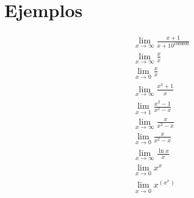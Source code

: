 \documentclass[spanish,12pt]{article}
\begin{document}
\section{Ejemplos}
\begin{align*}
    &\lim_{x\to\infty} \frac{x+1}{x+10^{1000000}}\\
    &\lim_{x\to\infty} \frac{x}{x}\\
    &\lim_{x\to0} \frac{x}{x}\\
    &\lim_{x\to\infty} \frac{x^3+1}{x}\\
    &\lim_{x\to1} \frac{x^2-1}{x^2-x}\\
    &\lim_{x\to\infty} \frac{x}{x^2-x}\\
     &\lim_{x\to0} \frac{x}{x^2-x}\\
    &\lim_{x\to\infty} \frac{\ln{x}}{x}\\
    &\lim_{x\to 0} x^x\\
    &\lim_{x\to 0} x^{(x^x)}\\
\end{align*}
\end{document}
